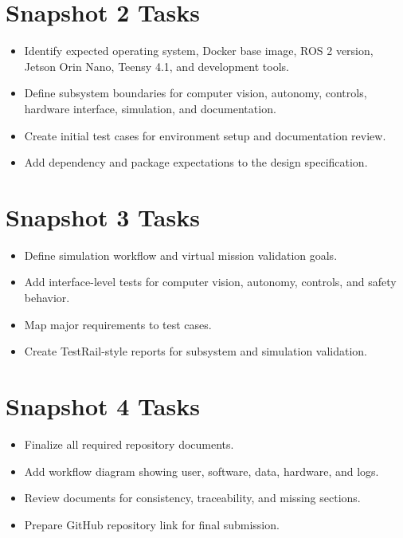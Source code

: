\documentclass[12pt]{article}
\begin{document}
\section{Snapshot 2 Tasks}
\begin{itemize}[leftmargin=*]
  \item Identify expected operating system, Docker base image, ROS 2 version, Jetson Orin Nano, Teensy 4.1, and development tools.
  \item Define subsystem boundaries for computer vision, autonomy, controls, hardware interface, simulation, and documentation.
  \item Create initial test cases for environment setup and documentation review.
  \item Add dependency and package expectations to the design specification.
\end{itemize}

\section{Snapshot 3 Tasks}
\begin{itemize}[leftmargin=*]
  \item Define simulation workflow and virtual mission validation goals.
  \item Add interface-level tests for computer vision, autonomy, controls, and safety behavior.
  \item Map major requirements to test cases.
  \item Create TestRail-style reports for subsystem and simulation validation.
\end{itemize}

\section{Snapshot 4 Tasks}
\begin{itemize}[leftmargin=*]
  \item Finalize all required repository documents.
  \item Add workflow diagram showing user, software, data, hardware, and logs.
  \item Review documents for consistency, traceability, and missing sections.
  \item Prepare GitHub repository link for final submission.
\end{itemize}
\end{document}
